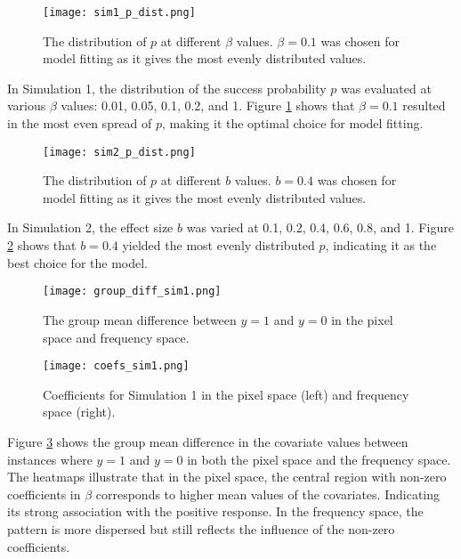 \documentclass[12pt]{article}
\begin{document}
\begin{figure}[H] 
	\centering
	\texttt{[image: sim1\_p\_dist.png]} 
	\caption{The distribution of \(p\) at different \(\beta\) values. \(\beta = 0.1\) was
chosen for model fitting as it gives the most evenly distributed values.}
	\label{fig:sim1_p_dist} 
\end{figure}

In Simulation 1, the distribution of the success probability \( p \) was
evaluated at various \( \beta \) values: 0.01, 0.05, 0.1, 0.2, and 1. Figure
\ref{fig:sim1_p_dist} shows that \( \beta = 0.1 \) resulted in the most even
spread of \( p \), making it the optimal choice for model fitting.

\begin{figure}[H] 
	\centering
	\texttt{[image: sim2\_p\_dist.png]} 
	\caption{The distribution of \(p\) at different \( b \) values. \( b = 0.4 \) was
chosen for model fitting as it gives the most evenly distributed values.}
	\label{fig:sim2_p_dist} 
\end{figure}

In Simulation 2, the effect size \( b \) was varied at 0.1, 0.2, 0.4, 0.6,
0.8, and 1. Figure \ref{fig:sim2_p_dist} shows that \( b = 0.4 \) yielded the most
evenly distributed \( p \), indicating it as the best choice for the model.

\begin{figure}[h!]
	\centering
	\texttt{[image: group\_diff\_sim1.png]}
	\caption{The group mean difference between \( y = 1 \) and \( y = 0 \) in
	the pixel space and frequency space.}
	\label{fig:group_diff1}
\end{figure}

\begin{figure}[h!]
	\centering
	\texttt{[image: coefs\_sim1.png]}
  \caption{Coefficients for Simulation 1 in the pixel space (left) and
	frequency space (right).}
  \label{fig:coefs_sim1}
\end{figure}

Figure \ref{fig:group_diff1} shows the group mean difference in the covariate
values between instances where \( y=1 \) and \( y=0	\) in both the pixel space
and the frequency space. The heatmaps illustrate that in the pixel space, the
central region with non-zero coefficients in \( \beta \) corresponds to higher
mean values of the covariates. Indicating its strong association with the
positive response. In the frequency space, the pattern is more dispersed but
still reflects the influence of the non-zero coefficients.
\end{document}
